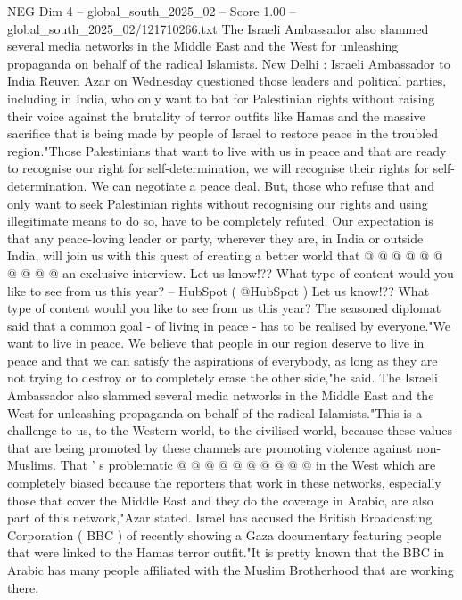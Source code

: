 \begin{textsample}{NEG Dim 4 – global\_south\_2025\_02 – Score 1.00 – global\_south\_2025\_02/121710266.txt}  \label{ex:f4_neg_433}
The Israeli Ambassador also slammed several media networks in the Middle East and the West for unleashing propaganda on behalf of the radical Islamists.
New Delhi : Israeli Ambassador to India Reuven Azar on Wednesday questioned those leaders and political parties, including in India, who only want to bat for Palestinian rights without raising their voice against the brutality of terror outfits like Hamas and the massive sacrifice that is being made by people of Israel to restore peace in the troubled region."Those Palestinians that want to live with us in peace and that are ready to recognise our right for self-determination, we will recognise their rights for self-determination.
We can negotiate a peace deal.
But, those who refuse that and only want to seek Palestinian rights without recognising our rights and using illegitimate means to do so, have to be completely refuted.
Our expectation is that any peace-loving leader or party, wherever they are, in India or outside India, will join us with this quest of creating a better world that @ @ @ @ @ @ @ @ @ @ an exclusive interview.
Let us know!??
What type of content would you like to see from us this year? -- HubSpot ( @HubSpot ) Let us know!??
What type of content would you like to see from us this year?
The seasoned diplomat said that a common goal - of living in peace - has to be realised by everyone."We want to live in peace.
We believe that people in our region deserve to live in peace and that we can satisfy the aspirations of everybody, as long as they are not trying to destroy or to completely erase the other side,"he said.
The Israeli Ambassador also slammed several media networks in the Middle East and the West for unleashing propaganda on behalf of the radical Islamists."This is a challenge to us, to the Western world, to the civilised world, because these values that are being promoted by these channels are promoting violence against non-Muslims.
That ' s problematic @ @ @ @ @ @ @ @ @ @ in the West which are completely biased because the reporters that work in these networks, especially those that cover the Middle East and they do the coverage in Arabic, are also part of this network,"Azar stated.
Israel has accused the British Broadcasting Corporation ( BBC ) of recently showing a Gaza documentary featuring people that were linked to the Hamas terror outfit."It is pretty known that the BBC in Arabic has many people affiliated with the Muslim Brotherhood that are working there.

\end{textsample}
